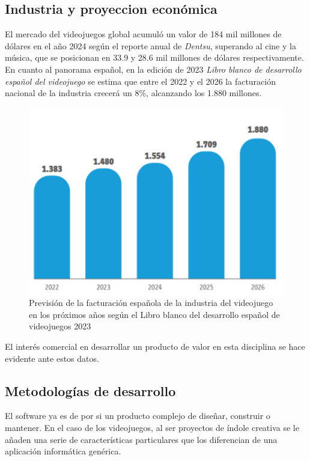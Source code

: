 \subsection{Industria y proyeccion económica}

El mercado del videojuegos global acumuló un valor de 184 mil millones de dólares en el año 2024 según el reporte anual de \textit{Dentsu}\cite{dentsu-report}, superando al cine y la música, que se posicionan en 33.9 y 28.6 mil millones de dólares respectivamente. En cuanto al panorama español, en la edición de 2023 \textit{Libro blanco de desarrollo español del videojuego}\cite{libro-blanco} se estima que entre el 2022 y el 2026 la facturación nacional de la industria crecerá un 8\%, alcanzando los 1.880 millones.

\begin{figure}[h]
    \centering
    \includegraphics[scale=0.5]{img/prevision_libroblanco.png}
    \caption[Previsión de facturación española de videojuegos]{Previsión de la facturación española de la industria del videojuego en los próximos años según el Libro blanco del desarrollo español de videojuegos 2023}
    \label{fig:prevlibroblanco}
\end{figure}

El interés comercial en desarrollar un producto de valor en esta disciplina se hace evidente ante estos datos.

\subsection{Metodologías de desarrollo}

El software ya es de por si un producto complejo de diseñar, construir o mantener. En el caso de los videojuegos, al ser proyectos de índole creativa se le añaden una serie de características particulares que los diferencian de una aplicación informática genérica.

